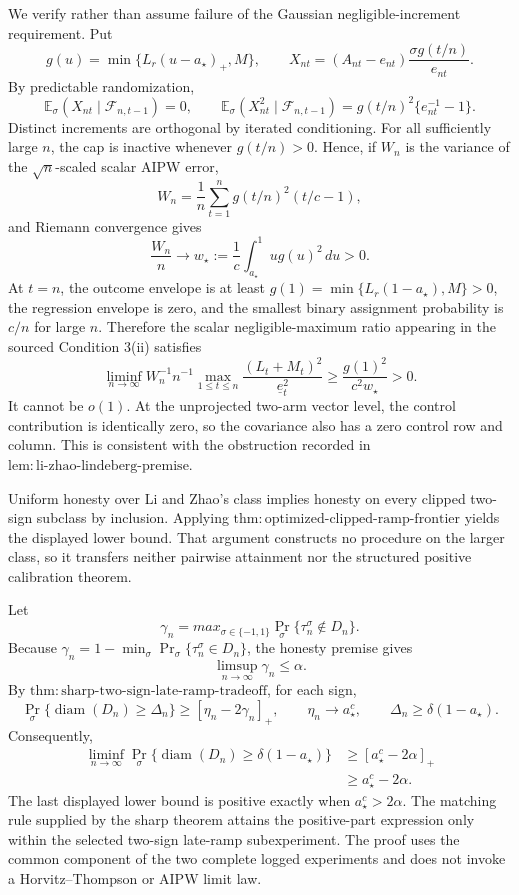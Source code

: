 We verify rather than assume failure of the Gaussian negligible-increment requirement. Put
\[
 g(u)=\min\{L_r(u-a_\star)_+,M\},
 \qquad
 X_{nt}=(A_{nt}-e_{nt})\frac{\sigma g(t/n)}{e_{nt}}.
\]
By predictable randomization,
\[
 \mathbb E_\sigma(X_{nt}\mid\mathcal F_{n,t-1})=0,
 \qquad
 \mathbb E_\sigma(X_{nt}^2\mid\mathcal F_{n,t-1})
 =g(t/n)^2\{e_{nt}^{-1}-1\}.
\]
Distinct increments are orthogonal by iterated conditioning. For all sufficiently large \(n\), the cap is inactive whenever \(g(t/n)>0\). Hence, if \(W_n\) is the variance of the \(\sqrt n\)-scaled scalar AIPW error,
\[
 W_n=\frac1n\sum_{t=1}^n g(t/n)^2(t/c-1),
\]
and Riemann convergence gives
\[
 \frac{W_n}{n}\longrightarrow
 w_\star:=\frac1c\int_{a_\star}^1u g(u)^2\,du>0.
\]
At \(t=n\), the outcome envelope is at least
\(g(1)=\min\{L_r(1-a_\star),M\}>0\), the regression envelope is zero, and the smallest binary assignment probability is \(c/n\) for large \(n\). Therefore the scalar negligible-maximum ratio appearing in the sourced Condition 3(ii) satisfies
\[
 \liminf_{n\to\infty}
 W_n^{-1}n^{-1}
 \max_{1\le t\le n}
 \frac{(L_t+M_t)^2}{\underline e_t^2}
 \ge\frac{g(1)^2}{c^2w_\star}>0.
\]
It cannot be \(o(1)\). At the unprojected two-arm vector level, the control contribution is identically zero, so the covariance also has a zero control row and column. This is consistent with the obstruction recorded in \(\mathrm{lem:li\mbox{-}zhao\mbox{-}lindeberg\mbox{-}premise}\).

Uniform honesty over Li and Zhao's class implies honesty on every clipped two-sign subclass by inclusion. Applying \(\mathrm{thm:optimized\mbox{-}clipped\mbox{-}ramp\mbox{-}frontier}\) yields the displayed lower bound. That argument constructs no procedure on the larger class, so it transfers neither pairwise attainment nor the structured positive calibration theorem.

Let
\[
 \gamma_n=max_{\sigma\in\{-1,1\}}
 \Pr_\sigma\{\tau_n^\sigma\notin D_n\}.
\]
Because \(\gamma_n=1-\min_\sigma\Pr_\sigma\{\tau_n^\sigma\in D_n\}\), the honesty premise gives
\[
 \limsup_{n\to\infty}\gamma_n\le\alpha.
\]
By \(\mathrm{thm:sharp\mbox{-}two\mbox{-}sign\mbox{-}late\mbox{-}ramp\mbox{-}tradeoff}\), for each sign,
\[
 \Pr_\sigma\{\operatorname{diam}(D_n)\ge\Delta_n\}
 \ge[\eta_n-2\gamma_n]_+,
 \qquad
 \eta_n\to a_\star^c,
 \qquad
 \Delta_n\ge\delta(1-a_\star).
\]
Consequently,
\[
 \begin{aligned}
 \liminf_{n\to\infty}
 \Pr_\sigma\{\operatorname{diam}(D_n)
                 \ge\delta(1-a_\star)\}
 &\ge[a_\star^c-2\alpha]_+\\
 &\ge a_\star^c-2\alpha.
 \end{aligned}
\]
The last displayed lower bound is positive exactly when \(a_\star^c>2\alpha\). The matching rule supplied by the sharp theorem attains the positive-part expression only within the selected two-sign late-ramp subexperiment. The proof uses the common component of the two complete logged experiments and does not invoke a Horvitz--Thompson or AIPW limit law.

